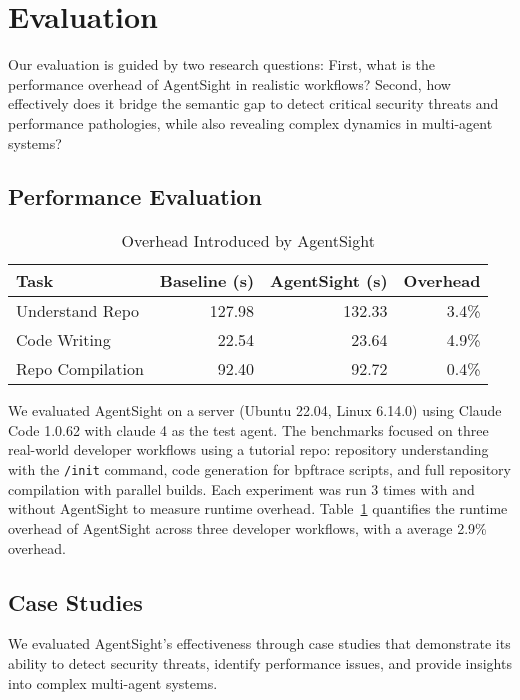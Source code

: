 \section{Evaluation}

Our evaluation is guided by two research questions: First, what is the performance overhead of AgentSight in realistic workflows? Second, how effectively does it bridge the semantic gap to detect critical security threats and performance pathologies, while also revealing complex dynamics in multi-agent systems?

\subsection{Performance Evaluation}

\begin{table}[h]
\centering
\caption{Overhead Introduced by AgentSight}
\label{tab:build-overhead}
\begin{tabular}{lrrr}
\toprule
Task & Baseline (s) & AgentSight (s) & Overhead \\
\midrule
Understand Repo & 127.98 & 132.33 & 3.4\% \\
Code Writing & 22.54 & 23.64 & 4.9\% \\
Repo Compilation & 92.40 & 92.72 & 0.4\% \\
\bottomrule
\end{tabular}
\end{table}

 We evaluated AgentSight on a server (Ubuntu 22.04, Linux 6.14.0) using Claude Code 1.0.62\cite{claudecode} with claude 4 as the test agent. The benchmarks focused on three real-world developer workflows using a tutorial repo\cite{ebpftutorial}: repository understanding with the \texttt{/init} command, code generation for bpftrace scripts, and full repository compilation with parallel builds. Each experiment was run 3 times with and without AgentSight to measure runtime overhead.
Table~\ref{tab:build-overhead} quantifies the runtime overhead of AgentSight across three developer workflows, with a average 2.9\% overhead.  

\subsection{Case Studies}

We evaluated AgentSight's effectiveness through case studies that demonstrate its ability to detect security threats, identify performance issues, and provide insights into complex multi-agent systems.

